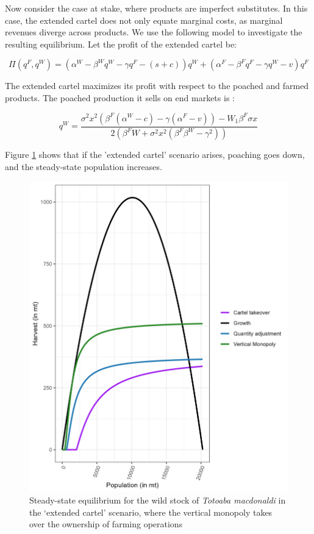 Now consider the case at stake, where products are imperfect substitutes. In this case, the extended cartel does not only equate marginal costs, as marginal revenues diverge across products. We use the following model to investigate the resulting equilibrium. Let the profit of the extended cartel be:

\begin{equation}
\Pi(q^F, q^W) = (\alpha^W - \beta^W q^W - \gamma q^F - (s+c))q^W + (\alpha^F - \beta^F q^F - \gamma q^W - v)q^F
\end{equation}

The extended cartel maximizes its profit with respect to the poached and farmed products. The poached production it sells on end markets is : 

\begin{equation}
q^W = \frac{\sigma^2 x^2 (\beta^F(\alpha^W -c) - \gamma (\alpha^F - v)) - W_1 \beta^F \sigma x }{2(\beta^F W + \sigma^2 x^2 (\beta^F \beta^W - \gamma^2)) }
\end{equation}

Figure \ref{fig:extended_cartel} shows that if the 'extended cartel' scenario arises, poaching goes down, and the steady-state population increases.
%
\begin{figure}
    \centering
    \includegraphics[width = .7\textwidth]{figures/totoaba/sup_figure2.png}
    \caption{ Steady-state equilibrium for the wild stock of \textit{Totoaba macdonaldi }in the ‘extended cartel’ scenario, where the vertical monopoly takes over the ownership of farming operations}
    \label{fig:extended_cartel}
\end{figure}

